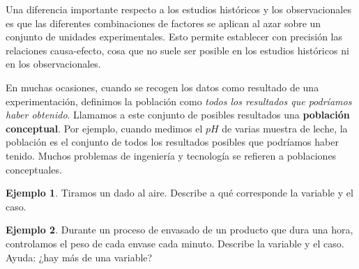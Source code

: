\documentclass[
  letterpaper,
]{scrbook}
\begin{document}
Una diferencia importante respecto a los estudios históricos y los
observacionales es que las diferentes combinaciones de factores se
aplican al azar sobre un conjunto de unidades experimentales. Esto
permite establecer con precisión las relaciones causa-efecto, cosa que
no suele ser posible en los estudios históricos ni en los
observacionales.


{}

En muchas ocasiones, cuando se recogen los datos como resultado de una
experimentación, definimos la población como \emph{todos los resultados
que podríamos haber obtenido}. Llamamos a este conjunto de posibles
resultados una \textbf{población conceptual}. Por ejemplo, cuando
medimos el \(pH\) de varias muestra de leche, la población es el
conjunto de todos los resultados posibles que podríamos haber tenido.
Muchos problemas de ingeniería y tecnología se refieren a poblaciones
conceptuales.

\begin{tcolorbox}[enhanced jigsaw, toprule=.15mm, rightrule=.15mm, left=2mm, bottomtitle=1mm, titlerule=0mm, colback=white, colframe=quarto-callout-tip-color-frame, toptitle=1mm, opacitybacktitle=0.6, breakable, title={Ejemplos de variables}, arc=.35mm, bottomrule=.15mm, colbacktitle=quarto-callout-tip-color!10!white, leftrule=.75mm, opacityback=0, coltitle=black]
\textbf{Ejemplo 1}. Tiramos un dado al aire. Describe a qué corresponde
la variable y el caso.

\textbf{Ejemplo 2}. Durante un proceso de envasado de un producto que
dura una hora, controlamos el peso de cada envase cada minuto. Describe
la variable y el caso. Ayuda: ¿hay más de una variable?
\end{tcolorbox}

\end{document}
